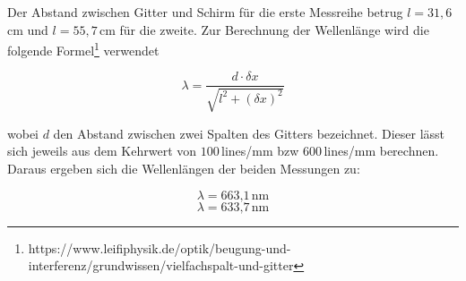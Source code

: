 Der Abstand zwischen Gitter und Schirm für die erste Messreihe betrug $l = 31,6$\,cm und $l = 55,7$\,cm für die zweite. Zur Berechnung der Wellenlänge wird die folgende Formel\footnote{https://www.leifiphysik.de/optik/beugung-und-interferenz/grundwissen/vielfachspalt-und-gitter} verwendet

\begin{equation}
\lambda = \frac{d\cdot \delta x}{\sqrt{l^{2} +  (\delta x)^{2}}}
\end{equation}

 wobei $d$ den Abstand zwischen zwei Spalten des Gitters bezeichnet. Dieser lässt sich jeweils aus dem Kehrwert von $100$\,lines/mm bzw $600$\,lines/mm berechnen. Daraus ergeben sich die Wellenlängen der beiden Messungen zu:

\begin{equation}
\lambda = \text{663,1}\,\text{nm}
\end{equation}
\begin{equation}
\lambda = \text{633,7}\,\text{nm}
\end{equation}


































